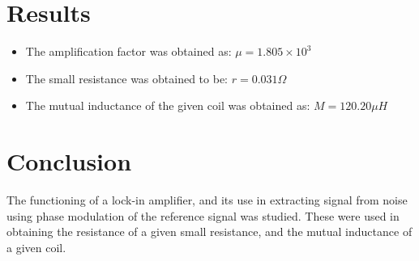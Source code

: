 \documentclass{ieeeconf}
\begin{document}
\section{Results}
\begin{itemize}
\tightlist
\item
The amplification factor was obtained as: \(\mu = 1.805 \times 10^3\)
\item
The small resistance was obtained to be: \(r =0.031\Omega\)
\item
The mutual inductance of the given coil was obtained as: \(M = 120.20 \mu H\)
\end{itemize}
\section{Conclusion}
The functioning of a lock-in amplifier, and its use in extracting signal from noise using phase modulation of the reference signal was studied. These were used in obtaining the resistance of a given small resistance, and the mutual inductance of a given coil.
\clearpage
\end{document}
